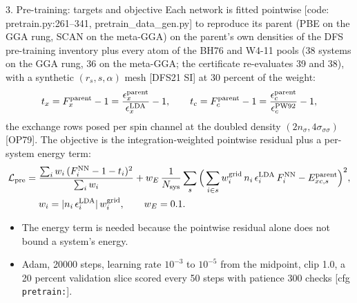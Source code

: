 \begin{frame}{3. Pre-training: targets and objective}
  \small
  Each network is fitted pointwise [code: pretrain.py:261--341, pretrain\_data\_gen.py] to reproduce its parent (PBE on the GGA rung, SCAN on the meta-GGA) on the parent's own densities of the DFS pre-training inventory plus every atom of the BH76 and W4-11 pools (38 systems on the GGA rung, 36 on the meta-GGA; the certificate re-evaluates 39 and 38), with a synthetic $(r_s, s, \alpha)$ mesh [DFS21 SI] at 30 percent of the weight:
  \[
  t_x = F_x^{\rm parent} - 1 = \frac{\epsilon_x^{\rm parent}}{\epsilon_x^{\rm LDA}} - 1, \qquad
  t_c = F_c^{\rm parent} - 1 = \frac{\epsilon_c^{\rm parent}}{\epsilon_c^{\rm PW92}} - 1,
  \]
  the exchange rows posed per spin channel at the doubled density $(2 n_\sigma, 4\sigma_{\sigma\sigma})$ [OP79]. The objective is the integration-weighted pointwise residual plus a per-system energy term:
  \[
  \begin{aligned}
  \mathcal{L}_{\rm pre} = {} & \frac{\sum_i w_i\,(F_i^{\rm NN} - 1 - t_i)^2}{\sum_i w_i}
  + w_E\,\frac{1}{N_{\rm sys}}\sum_{s}\Big(\sum_{i\in s} w^{\rm grid}_i\, n_i\,\epsilon_i^{\rm LDA}\, F_i^{\rm NN} - E_{xc,s}^{\rm parent}\Big)^2, \\
  & w_i = |n_i\, \epsilon_i^{\rm LDA}|\, w_i^{\rm grid}, \qquad w_E = 0.1 .
  \end{aligned}
  \]
  \begin{itemize}
    \item The energy term is needed because the pointwise residual alone does not bound a system's energy.
    \item Adam, 20000 steps, learning rate $10^{-3}$ to $10^{-5}$ from the midpoint, clip 1.0, a 20 percent validation slice scored every 50 steps with patience 300 checks [cfg \texttt{pretrain:}].
  \end{itemize}
\end{frame}
